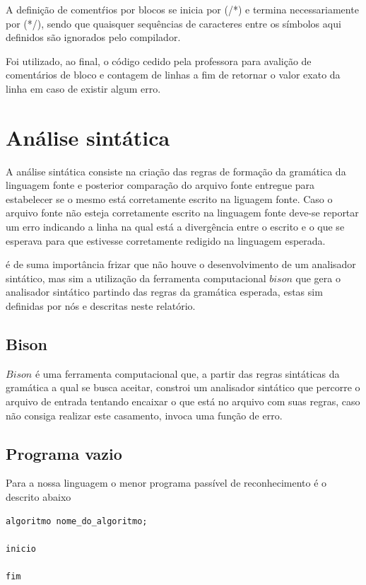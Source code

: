 \documentclass[a4paper,12pt]{report}
\begin{document}
A defini\c{c}\~ao de coment\'rios por blocos se inicia por (/*) e termina necessariamente por (*/), 
sendo que quaisquer sequ\^encias de caracteres entre os s\'imbolos aqui definidos s\~ao 
ignorados pelo compilador.

Foi utilizado, ao final, o c\'odigo cedido pela professora para avali\c{c}\~ao de coment\'arios de bloco e contagem de linhas a fim de retornar o valor exato da linha em caso de existir algum erro. 

\section{An\'alise sint\'atica}

A an\'alise sint\'atica consiste na cria\c{c}\~ao das regras de forma\c{c}\~ao da gram\'atica da linguagem fonte e 
posterior compara\c{c}\~ao do arquivo fonte entregue para estabelecer se o mesmo est\'a corretamente escrito
na liguagem fonte. Caso o arquivo fonte n\~ao esteja corretamente escrito na linguagem fonte deve-se
reportar um erro indicando a linha na qual est\'a a diverg\^encia entre o escrito e o que se esperava para
que estivesse corretamente redigido na linguagem esperada.

\'e de suma import\^ancia frizar que n\~ao houve o desenvolvimento de um analisador sint\'atico, mas sim a 
utiliza\c{c}\~ao da ferramenta computacional $bison$ que gera o analisador sint\'atico partindo das regras
da gram\'atica esperada, estas sim definidas por n\'os e descritas neste relat\'orio.


\subsection{Bison}

$Bison$ \'e uma ferramenta computacional que, a partir das regras sint\'aticas da gram\'atica a qual se busca
aceitar, constroi um analisador sint\'atico que percorre o arquivo de entrada tentando encaixar o que est\'a
no arquivo com suas regras, caso n\~ao consiga realizar este casamento, invoca uma fun\c{c}\~ao de erro.

\subsection{Programa vazio}

Para a nossa linguagem o menor programa pass\'ivel de reconhecimento \'e o descrito abaixo

\begin{verbatim}
algoritmo nome_do_algoritmo;

inicio

fim
\end{verbatim}
\end{document}
